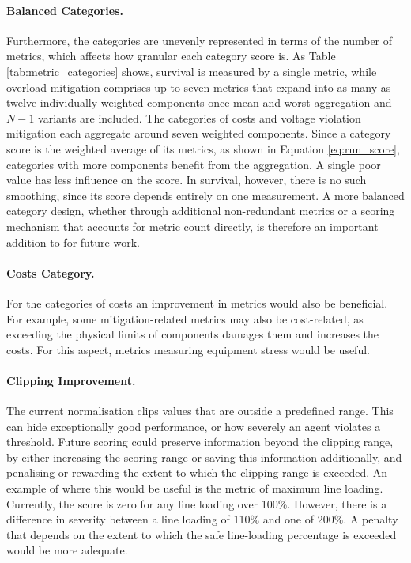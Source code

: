 \paragraph{Balanced Categories.}
Furthermore, the categories are unevenly represented in terms of the number of metrics, which affects how granular each category score is. As Table \ref{tab:metric_categories} shows, survival is measured by a single metric, while overload mitigation comprises up to seven metrics that expand into as many as twelve individually weighted components once mean and worst aggregation and $N-1$ variants are included. The categories of costs and voltage violation mitigation each aggregate around seven weighted components. Since a category score is the weighted average of its metrics, as shown in Equation \ref{eq:run_score}, categories with more components benefit from the aggregation. A single poor value has less influence on the score. In survival, however, there is no such smoothing, since its score depends entirely on one measurement. A more balanced category design, whether through additional non-redundant metrics or a scoring mechanism that accounts for metric count directly, is therefore an important addition to \benchmark for future work.

\paragraph{Costs Category.}
For the categories of costs an improvement in metrics would also be beneficial. For example, some mitigation-related metrics may also be cost-related, as exceeding the physical limits of components damages them and increases the costs. For this aspect, metrics measuring equipment stress would be useful.

\paragraph{Clipping Improvement.} 
The current normalisation clips values that are outside a predefined range. 
This can hide exceptionally good performance, or how severely an agent violates a threshold. 
Future scoring could preserve information beyond the clipping range, by either increasing the scoring range or saving this information additionally, and penalising or rewarding the extent to which the clipping range is exceeded. An example of where this would be useful is the metric of maximum line loading. Currently, the score is zero for any line loading over 100\%. However, there is a difference in severity between a line loading of 110\% and one of 200\%. A penalty that depends on the extent to which the safe line-loading percentage is exceeded would be more adequate.



